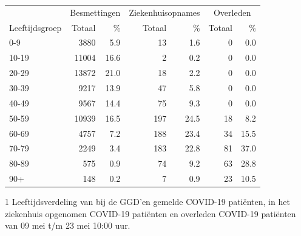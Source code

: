 \documentclass[
  english,
  man,floatsintext]{apa6}
\begin{document}
\begin{table}
\centering\begingroup\fontsize{11}{13}\selectfont

\begin{threeparttable}
\begin{tabular}{lrrrrrr}
\toprule
\multicolumn{1}{c}{ } & \multicolumn{2}{c}{Besmettingen} & \multicolumn{2}{c}{Ziekenhuisopnames} & \multicolumn{2}{c}{Overleden} \\
\cmidrule(l{3pt}r{3pt}){2-3} \cmidrule(l{3pt}r{3pt}){4-5} \cmidrule(l{3pt}r{3pt}){6-7}
Leeftijdsgroep & Totaal & \% & Totaal & \% & Totaal & \%\\
\midrule
0-9 & 3880 & 5.9 & 13 & 1.6 & 0 & 0.0\\
10-19 & 11004 & 16.6 & 2 & 0.2 & 0 & 0.0\\
20-29 & 13872 & 21.0 & 18 & 2.2 & 0 & 0.0\\
30-39 & 9217 & 13.9 & 47 & 5.8 & 0 & 0.0\\
40-49 & 9567 & 14.4 & 75 & 9.3 & 0 & 0.0\\
50-59 & 10939 & 16.5 & 197 & 24.5 & 18 & 8.2\\
60-69 & 4757 & 7.2 & 188 & 23.4 & 34 & 15.5\\
70-79 & 2249 & 3.4 & 183 & 22.8 & 81 & 37.0\\
80-89 & 575 & 0.9 & 74 & 9.2 & 63 & 28.8\\
90+ & 148 & 0.2 & 7 & 0.9 & 23 & 10.5\\
\bottomrule
\end{tabular}
\begin{tablenotes}
\item[1] Leeftijdsverdeling van bij de GGD’en gemelde COVID-19 patiënten, in het ziekenhuis opgenomen COVID-19 patiënten en overleden COVID-19 patiënten van 09 mei t/m 23 mei 10:00 uur.
\end{tablenotes}
\end{threeparttable}
\endgroup{}
\end{table}

\newpage
\end{document}
